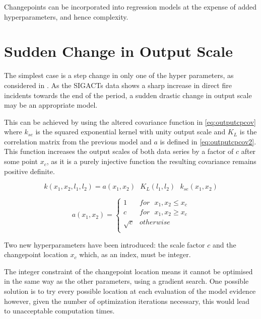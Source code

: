 \documentclass[a4paper,11pt]{report}
\begin{document}
Changepoints can be incorporated into regression models at the expense of added hyperparameters, and hence complexity.

\section{Sudden Change in Output Scale}

The simplest case is a step change in only one of the hyper parameters, as considered in \cite{changepoint-prediction}. As the SIGACTs data shows a sharp increase in direct fire incidents towards the end of the period, a sudden drastic change in output scale may be an appropriate model.

This can be achieved by using the altered covariance function in \ref{eq:outputcpcov} where \(k_{se}\) is the squared exponential kernel with unity output scale and \(K_L\) is the correlation matrix from the previous model and \(a\) is defined in \ref{eq:outputcpcov2}. This function increases the output scales of both data series by a factor of \(c\) after some point \(x_c\), as it is a purely injective function the resulting covariance remains positive definite. 

\singlespacing
\begin{equation} \label{eq:outputcpcov}
k(x_1,x_2,l_1,l_2) = a(x_1,x_2)\text{ } K_L(l_1,l_2) \text{ }k_{se}(x_1,x_2)
\end{equation}

\begin{equation} \label{eq:outputcpcov2}
a(x_1,x_2) = \begin{cases}
1 & for \text{ } x_1, x_2 \leq x_c \\
c & for \text{ } x_1, x_2 \geq x_c \\ 
\sqrt{c} & otherwise \\ 
\end{cases}
\end{equation}
\doublespacing

Two new hyperparameters have been introduced: the scale factor \(c\) and the changepoint location \(x_c\) which, as an index, must be integer. 

The integer constraint of the changepoint location means it cannot be optimised in the same way as the other parameters, using a gradient search. One possible solution is to try every possible location at each evaluation of the model evidence however, given the number of optimization iterations necessary, this would lead to unacceptable computation times.
\end{document}
